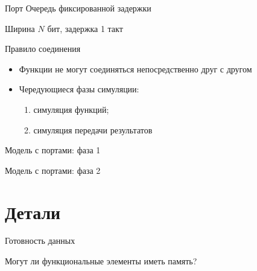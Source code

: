 \documentclass{beamer}
\begin{document}
\begin{frame}{Порт}
Очередь фиксированной задержки

Ширина $N$ бит, задержка 1 такт

\vfill
\centering


\end{frame}

\begin{frame}{Правило соединения}

\begin{itemize}
\item Функции не могут соединяться непосредственно друг с другом
\item Чередующиеся фазы симуляции:
\begin{enumerate}
    \item симуляция функций;
    \item симуляция передачи результатов
\end{enumerate}
\end{itemize}
\end{frame}

\begin{frame}{Модель с портами: фаза 1}

\centering


\end{frame}

\begin{frame}{Модель с портами: фаза 2}

\centering


\end{frame}


\section{Детали}

\begin{frame}{Готовность данных}

\centering


\end{frame}

\begin{frame}{Могут ли функциональные элементы иметь память?}

\centering


\end{frame}
\end{document}
